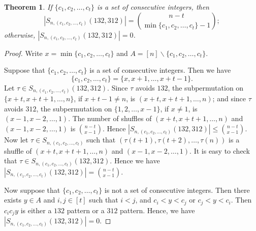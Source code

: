 \documentclass[11pt]{article}
\newtheorem{theorem}{Theorem}[section]
\theoremstyle{definition}
\numberwithin{equation}{section}
\begin{document}
\begin{theorem}
If $\{c_1,c_2,\ldots,c_t\}$ is a set of consecutive integers, then 
\[
|S_{n,(c_1,c_2,\ldots,c_t)}(132,312)|=\binom{n-t}{\min\{c_1,c_2,\ldots,c_t\}-1};
\]
otherwise, $|S_{n,(c_1,c_2,\ldots,c_t)}(132,312)|=0$.
\end{theorem}
\begin{proof}
Write $x=\min\{c_1,c_2,\ldots,c_t\}$ and $A=[n]\backslash\{c_1,c_2,\ldots,c_t\}$.

Suppose that $\{c_1,c_2,\ldots,c_t\}$ is a set of consecutive integers. Then we have \[\{c_1,c_2,\ldots,c_t\}=\{x,x+1,\ldots,x+t-1\}.\] Let $\tau\in S_{n,(c_1,c_2,\ldots,c_t)}(132,312)$. Since $\tau$ avoids $132$, the subpermutation on $\{x+t,x+t+1,\ldots,n\}$, if $x+t-1\neq n$, is $(x+t,x+t+1,\ldots,n)$; and since $\tau$ avoids $312$, the subpermutation on $\{1,2,\ldots,x-1\}$, if $x\neq 1$, is $(x-1,x-2,\ldots,1)$. The number of shuffles of $(x+t,x+t+1,\ldots,n)$ and $(x-1,x-2,\ldots,1)$ is $\binom{n-t}{x-1}$. Hence $|S_{n,(c_1,c_2,\ldots,c_t)}(132,312)|\leq \binom{n-t}{x-1}$. Now let $\tau\in S_{n,(c_1,c_2,\ldots,c_t)}$ such that $(\tau(t+1),\tau(t+2),\ldots,\tau(n))$ is a shuffle of $(x+t,x+t+1,\ldots,n)$ and $(x-1,x-2,\ldots,1)$. It is easy to check that $\tau\in S_{n,(c_1,c_2,\ldots,c_t)}(132,312)$. Hence we have $|S_{n,(c_1,c_2,\ldots,c_t)}(132,312)|=\binom{n-t}{x-1}$.

Now suppose that $\{c_1,c_2,\ldots,c_t\}$ is not a set of consecutive integers. Then there exists $y\in A$ and $i,j\in[t]$ such that $i<j$, and $c_i<y<c_j$ or $c_j<y<c_i$. Then $c_ic_jy$ is either a $132$ pattern or a $312$ pattern. Hence, we have $|S_{n,(c_1,c_2,\ldots,c_t)}(132,312)|=0$.
\end{proof}
\end{document}

